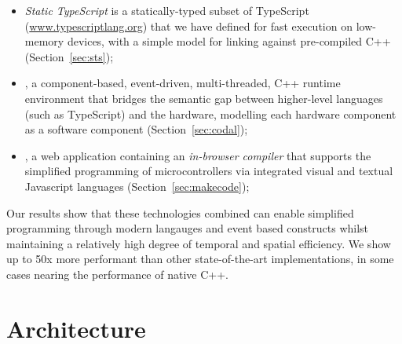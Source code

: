 \begin{itemize}
\item \emph{Static TypeScript} is a statically-typed subset of TypeScript
(\url{www.typescriptlang.org}) that we have defined for fast execution on low-memory devices,
with a simple model for linking against pre-compiled C++ (Section~\ref{sec:sts});

\item \emph{\CO}, a component-based, event-driven, multi-threaded, C++ runtime environment
that bridges the semantic gap between higher-level languages (such as TypeScript) and the hardware,
modelling each hardware component as a software component (Section~\ref{sec:codal});

\item \emph{\MCN}, a web application containing an \emph{in-browser compiler} that supports the 
simplified programming of microcontrollers via integrated visual and textual Javascript languages (Section~\ref{sec:makecode});
\end{itemize}

Our results show that these technologies combined can enable simplified programming through modern
langauges and event based constructs whilst maintaining a relatively high degree of temporal and spatial efficiency. 
We show up to 50x more performant than other state-of-the-art implementations, in some cases nearing the performance of native C++. 



    


\section{Architecture}








\begin{comment}
Web-based visual editors such as
Blockly (\url{https://developers.google.com/blockly/})~\cite{Blocky2015}
are tremendously popular and allow the creation of programs without the
possibility of syntax errors, and that execute in the web browser (Blockly
is written in JavaScript and compiles user code to JavaScript).
However, JavaScript's dynamic nature is not well-suited to the world of
microcontrollers where memory is limited (consider the Arduino Uno mentioned above).
\end{comment}

